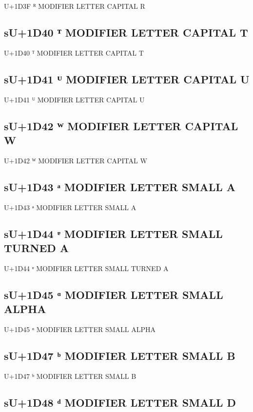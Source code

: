U+1D3F ᴿ MODIFIER LETTER CAPITAL R

\subsection{sU+1D40 ᵀ MODIFIER LETTER CAPITAL T}

U+1D40 ᵀ MODIFIER LETTER CAPITAL T

\subsection{sU+1D41 ᵁ MODIFIER LETTER CAPITAL U}

U+1D41 ᵁ MODIFIER LETTER CAPITAL U

\subsection{sU+1D42 ᵂ MODIFIER LETTER CAPITAL W}

U+1D42 ᵂ MODIFIER LETTER CAPITAL W

\subsection{sU+1D43 ᵃ MODIFIER LETTER SMALL A}

U+1D43 ᵃ MODIFIER LETTER SMALL A

\subsection{sU+1D44 ᵄ MODIFIER LETTER SMALL TURNED A}

U+1D44 ᵄ MODIFIER LETTER SMALL TURNED A

\subsection{sU+1D45 ᵅ MODIFIER LETTER SMALL ALPHA}

U+1D45 ᵅ MODIFIER LETTER SMALL ALPHA

\subsection{sU+1D47 ᵇ MODIFIER LETTER SMALL B}

U+1D47 ᵇ MODIFIER LETTER SMALL B

\subsection{sU+1D48 ᵈ MODIFIER LETTER SMALL D}

